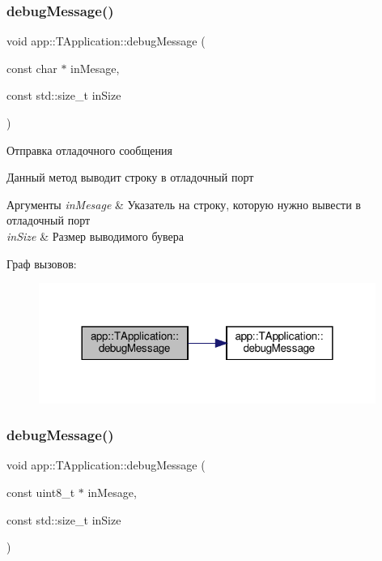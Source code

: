 \subsubsection{\texorpdfstring{debug\+Message()}{debugMessage()}\hspace{0.1cm}{\footnotesize\ttfamily [2/4]}}
{\footnotesize\ttfamily void app\+::\+T\+Application\+::debug\+Message (\begin{DoxyParamCaption}\item[{const char $\ast$}]{in\+Mesage,  }\item[{const std\+::size\+\_\+t}]{in\+Size }\end{DoxyParamCaption})}



Отправка отладочного сообщения 

Данный метод выводит строку в отладочный порт 
\begin{DoxyParams}{Аргументы}
{\em in\+Mesage} & Указатель на строку, которую нужно вывести в отладочный порт \\
\hline
{\em in\+Size} & Размер выводимого бувера \\
\hline
\end{DoxyParams}
Граф вызовов\+:\nopagebreak
\begin{figure}[H]
\begin{center}
\leavevmode
\includegraphics[width=312pt]{classapp_1_1_t_application_ac0c8e394021c1d1ab4163bc8bd8f7b42_cgraph}
\end{center}
\end{figure}
\mbox{\label{classapp_1_1_t_application_a9f4f8b1ef208edca2c5ea5ef1851efca}} 
\subsubsection{\texorpdfstring{debug\+Message()}{debugMessage()}\hspace{0.1cm}{\footnotesize\ttfamily [3/4]}}
{\footnotesize\ttfamily void app\+::\+T\+Application\+::debug\+Message (\begin{DoxyParamCaption}\item[{const uint8\+\_\+t $\ast$}]{in\+Mesage,  }\item[{const std\+::size\+\_\+t}]{in\+Size }\end{DoxyParamCaption})}



